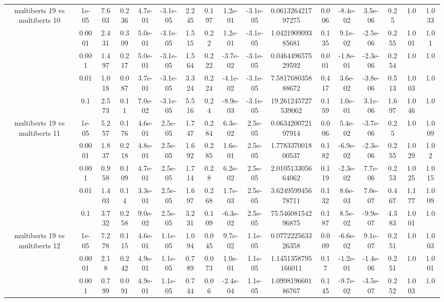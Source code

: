 \begin{tabular}{|c|c|c|c|c|c|c|c|c|c|c|c|c|c|c|c|c|}
\hline
\multirow{5}{*}{multiberts 19 vs multiberts 10} & 1e-05 & 7.603 & 0.236 & 4.7e-01 & -3.1e-05 & 2.245 & 0.197 & 1.2e-01 & -3.1e-05 & 0.061326421797275 & 0.006 & -8.4e-02 & 3.5e-06 & 0.25 & 1.0 & 1.033 \\
 & 0.0001 & 2.431 & 0.309 & 5.0e-01 & -3.1e-05 & 1.515 & 0.22 & 1.2e-01 & -3.1e-05 & 1.042190909385681 & 0.135 & 9.1e-02 & -2.5e-06 & 0.255 & 1.001 & 1.01 \\
 & 0.001 & 1.497 & 0.217 & 5.0e-01 & -3.1e-05 & 1.564 & 0.222 & -3.7e-02 & -3.1e-05 & 0.046449657529592 & 0.001 & -1.8e-01 & -2.3e-06 & 0.254 & 1.0 & 1.0 \\
 & 0.01 & 1.018 & 0.087 & 3.7e-01 & -3.1e-05 & 3.324 & 0.224 & -4.1e-02 & -3.1e-05 & 7.581768035888672 & 0.417 & 3.6e-02 & -3.8e-06 & 0.513 & 1.003 & 1.0 \\
 & 0.1 & 2.573 & 0.11 & 7.0e-02 & -3.1e-05 & 5.516 & 0.24 & -8.9e-03 & -3.1e-05 & 19.261245727539062 & 0.159 & 1.0e-01 & 3.1e-06 & 1.697 & 1.046 & 1.0 \\
\hline
\multirow{5}{*}{multiberts 19 vs multiberts 11} & 1e-05 & 5.257 & 0.176 & 4.6e-01 & 2.5e-05 & 1.747 & 0.284 & 6.3e-02 & 2.5e-05 & 0.063420072197914 & 0.006 & 5.4e-02 & -3.7e-06 & 0.25 & 1.0 & 1.009 \\
 & 0.0001 & 1.837 & 0.218 & 4.8e-01 & 2.5e-05 & 1.692 & 0.285 & 1.6e-01 & 2.5e-05 & 1.778337001800537 & 0.182 & -6.9e-02 & -2.3e-06 & 0.255 & 1.029 & 1.02 \\
 & 0.001 & 0.958 & 0.109 & 4.7e-01 & 2.5e-05 & 1.714 & 0.28 & 6.2e-02 & 2.5e-05 & 2.010513305664062 & 0.119 & -2.3e-02 & 7.7e-06 & 0.253 & 1.025 & 1.015 \\
 & 0.01 & 1.403 & 0.14 & 3.3e-01 & 2.5e-05 & 1.697 & 0.268 & 1.7e-03 & 2.5e-05 & 3.624959945678711 & 0.132 & 8.6e-03 & 7.0e-07 & 0.467 & 1.177 & 1.009 \\
 & 0.1 & 3.732 & 0.258 & 9.0e-02 & 2.5e-05 & 3.231 & 0.109 & -6.3e-02 & 2.5e-05 & 75.54608154296875 & 0.187 & 8.5e-02 & -9.9e-07 & 4.383 & 1.001 & 1.0 \\
\hline
\multirow{5}{*}{multiberts 19 vs multiberts 12} & 1e-05 & 7.278 & 0.115 & 4.6e-01 & 1.1e-05 & 1.094 & 0.045 & 9.7e-02 & 1.1e-05 & 0.077222563326358 & 0.009 & -6.6e-02 & 9.1e-07 & 0.251 & 1.0 & 1.003 \\
 & 0.0001 & 2.18 & 0.242 & 4.9e-01 & 1.1e-05 & 0.789 & 0.073 & 1.0e-01 & 1.1e-05 & 1.1451358795166011 & 0.17 & -1.2e-01 & -1.4e-06 & 0.251 & 1.0 & 1.001 \\
 & 0.001 & 0.799 & 0.091 & 4.9e-01 & 1.1e-05 & 0.744 & 0.06 & -2.4e-04 & 1.1e-05 & 1.099819660186767 & 0.145 & -9.7e-02 & -3.5e-07 & 0.252 & 1.003 & 1.0 \\

\end{tabular}
